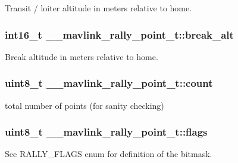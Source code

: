 Transit / loiter altitude in meters relative to home. 

\hypertarget{struct____mavlink__rally__point__t_ae9ba7f47b482b454886afec9c2c3edfa}{
\subsubsection[{break\+\_\+alt}]{\setlength{\rightskip}{0pt plus 5cm}int16\+\_\+t \+\_\+\+\_\+mavlink\+\_\+rally\+\_\+point\+\_\+t\+::break\+\_\+alt}}\label{struct____mavlink__rally__point__t_ae9ba7f47b482b454886afec9c2c3edfa}


Break altitude in meters relative to home. 

\hypertarget{struct____mavlink__rally__point__t_adf8b2c2fb0fff4d7b871638d7131d9a8}{
\subsubsection[{count}]{\setlength{\rightskip}{0pt plus 5cm}uint8\+\_\+t \+\_\+\+\_\+mavlink\+\_\+rally\+\_\+point\+\_\+t\+::count}}\label{struct____mavlink__rally__point__t_adf8b2c2fb0fff4d7b871638d7131d9a8}


total number of points (for sanity checking) 

\hypertarget{struct____mavlink__rally__point__t_a263b666b89c93d236a92656eb650cd54}{
\subsubsection[{flags}]{\setlength{\rightskip}{0pt plus 5cm}uint8\+\_\+t \+\_\+\+\_\+mavlink\+\_\+rally\+\_\+point\+\_\+t\+::flags}}\label{struct____mavlink__rally__point__t_a263b666b89c93d236a92656eb650cd54}


See R\+A\+L\+L\+Y\+\_\+\+F\+L\+A\+G\+S enum for definition of the bitmask. 

